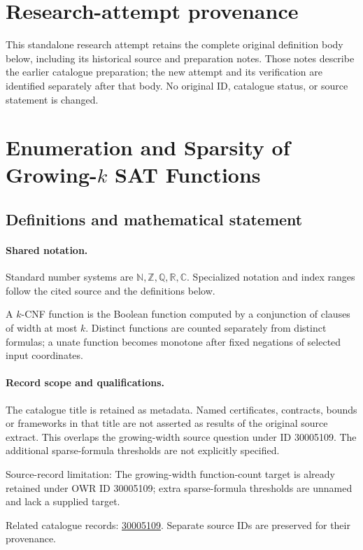\documentclass[11pt]{article}
\begin{document}
\section*{Research-attempt provenance}
This standalone research attempt retains the complete original definition body below,
including its historical source and preparation notes. Those notes describe the
earlier catalogue preparation; the new attempt and its verification are identified
separately after that body. No original ID, catalogue status, or source statement is changed.

\section{Enumeration and Sparsity of Growing-$k$ SAT Functions}\label{statement}

\subsection{Definitions and mathematical statement}

\paragraph{Shared notation.}Standard number systems are $\mathbb N,\mathbb Z,\mathbb Q,\mathbb R,\mathbb C$. Specialized notation and index ranges follow the cited source and the definitions below.


A $k$-CNF function is the Boolean function computed by a conjunction of clauses of width at most $k$. Distinct functions are counted separately from distinct formulas; a unate function becomes monotone after fixed negations of selected input coordinates.
\paragraph{Record scope and qualifications.}
The catalogue title is retained as metadata. Named certificates, contracts, bounds or frameworks in that title are not asserted as results of the original source extract.
This overlaps the growing-width source question under ID 30005109. The additional sparse-formula thresholds are not explicitly specified.

Source-record limitation: The growing-width function-count target is already retained under OWR ID 30005109; extra sparse-formula thresholds are unnamed and lack a supplied target.

Related catalogue records: \href{https://mehmetmars7.github.io/Erdosproblems-llm-hunter/problem.html?type=open_problems&id=30005109}{30005109}. Separate source IDs are preserved for their provenance.
\end{document}
